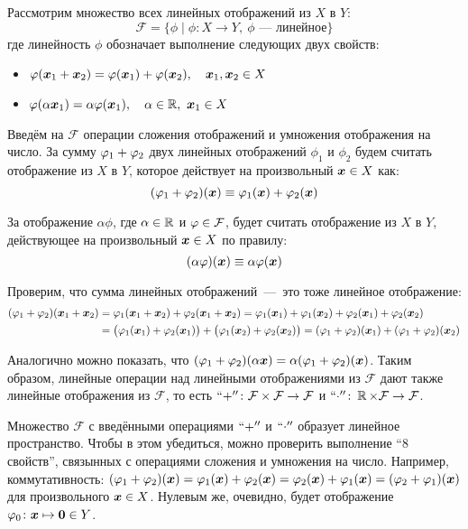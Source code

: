 \documentclass[a4paper,12pt]{article}
\begin{document}
  Рассмотрим множество всех линейных отображений из $X$ в $Y$:
  \[
    \mathcal F = \{\phi \mid \phi\colon X \to Y,\ \phi\mbox{~---~линейное}\}
  \]
  где линейность $\phi$ обозначает выполнение следующих двух свойств:
  \begin{itemize}
    \item $\varphi(\boldsymbol x_1 + \boldsymbol x_2) = \varphi(\boldsymbol x_1) + \varphi(\boldsymbol x_2),\quad \boldsymbol x_1, \boldsymbol x_2 \in X$
    \item $\varphi(\alpha \boldsymbol x_1) = \alpha \varphi(\boldsymbol x_1),\quad \alpha \in \operatorname{\mathbb R},\ \boldsymbol x_1 \in X$
  \end{itemize}
  
  Введём на $\mathcal F$ операции сложения отображений и умножения отображения на число.
  За сумму $\phi_1 \hm+ \phi_2$ двух линейных отображений $\phi_1$ и $\phi_2$ будем считать отображение из $X$ в $Y$, которое действует на произвольный $\bds x \hm\in X$ как:
  \[
    (\varphi_1 + \varphi_2) (\boldsymbol x) \equiv \varphi_1(\boldsymbol x) + \varphi_2(\boldsymbol x)
  \]
  
  За отображение $\alpha\phi$, где $\alpha \hm\in \RR$ и $\phi \hm\in \mathcal F$, будет считать отображение из $X$ в $Y$, действующее на произвольный $\bds x \hm\in X$ по правилу:
  \[
    (\alpha \varphi) (\boldsymbol x) \equiv \alpha \varphi(\boldsymbol x)
  \]
  
  Проверим, что сумма линейных отображений~---~это тоже линейное отображение:
  \begin{equation*}
  \begin{split}
    (\varphi_1 + \varphi_2) (\boldsymbol x_1 + \boldsymbol x_2)
    &= \varphi_1 (\boldsymbol x_1 + \boldsymbol x_2) + \varphi_2 (\boldsymbol x_1 + \boldsymbol x_2)
    = \varphi_1 (\boldsymbol x_1) + \varphi_1 (\boldsymbol x_2) + \varphi_2 (\boldsymbol x_1) + \varphi_2 (\boldsymbol x_2) \\
    &= \bigl(\varphi_1(\boldsymbol x_1) + \varphi_2(\boldsymbol x_1)\bigr) + \bigl(\varphi_1(\boldsymbol x_2) + \varphi_2(\boldsymbol x_2)\bigr)
    = (\varphi_1 + \varphi_2) (\boldsymbol x_1) + (\varphi_1 + \varphi_2) (\boldsymbol x_2)
  \end{split}
  \end{equation*}
  
  Аналогично можно показать, что $(\phi_1 \hm+ \phi_2) (\alpha \bds x) \hm= \alpha (\phi_1 \hm+ \phi_2) (\bds x)$.
  Таким образом, линейные операции над линейными отображениями из $\mathcal F$ дают также линейные отображения из $\mathcal F$,
  то есть $``{+}''\colon \mathcal F \hm\times \mathcal F \hm\to \mathcal F$ и $``{\cdot}'' \colon \RR \hm\times \mathcal F \hm\to \mathcal F$.
  
  Множество $\mathcal F$ с введёнными операциями $``{+}''$ и $``{\cdot}''$ образует линейное пространство.
  Чтобы в этом убедиться, можно проверить выполнение ``$8$ свойств'', связынных с операциями сложения и умножения на число.
  Например, коммутативность: $(\phi_1 \hm+ \phi_2)(\bds x) \hm= \phi_1(\bds x) \hm+ \phi_2(\bds x) \hm= \phi_2(\bds x) \hm+ \phi_1(\bds x) \hm= (\phi_2 \hm+ \phi_1)(\bds x)$ для произвольного $\bds x \hm\in X$.
  Нулевым же, очевидно, будет отображение $\phi_0\colon \bds x \hm\mapsto \bds 0 \hm\in Y$.
  
\end{document}
